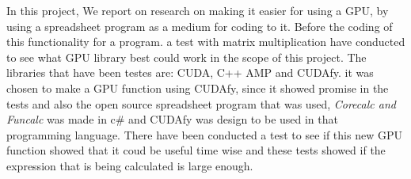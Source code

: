 In this project, We report on research on making it easier for using a GPU, by using a spreadsheet program as a medium for coding to it. Before the coding of this functionality for a program. a test with matrix multiplication have conducted to see what GPU library best could work in the scope of this project.
The libraries that have been testes are: CUDA, C++ AMP and CUDAfy. it was chosen to make a GPU function using CUDAfy, since it showed promise in the tests and also the open source spreadsheet program that was used, \textit{Corecalc and Funcalc} was made in c\# and CUDAfy was design to be used in that programming language.
There have been conducted a test to see if this new GPU function showed that it coud be useful time wise and these tests showed if the expression that is being calculated is large enough.